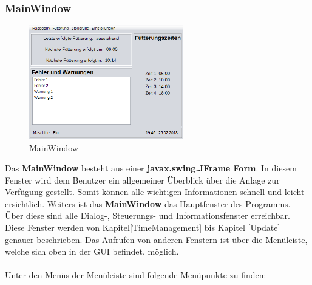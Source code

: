 \subsubsection{MainWindow}\label{subsubsec:MainWindow}
\begin{figure}
\vspace{-20pt}
  \begin{center}
    \includegraphics[width=0.60\textwidth]{Bilder/GUI/MainWindow}
  \end{center}
  \caption{MainWindow}
  \label{MainWindow}
  \vspace{20pt}
\end{figure}
Das \textbf{MainWindow} besteht aus einer \textbf{javax.swing.JFrame Form}. In diesem Fenster wird dem Benutzer ein allgemeiner Überblick über die Anlage zur Verfügung gestellt. Somit können alle wichtigen Informationen schnell und leicht ersichtlich. Weiters ist das \textbf{MainWindow} das Hauptfenster des Programms. Über diese sind alle Dialog-, Steuerungs- und Informationsfenster erreichbar. Diese Fenster werden von Kapitel\ref{TimeManagement} bis Kapitel \ref{Update} genauer beschrieben. Das Aufrufen von anderen Fenstern ist über die Menüleiste, welche sich oben in der \ac{GUI} befindet, möglich. 
\\ \\ Unter den Menüs der Menüleiste sind folgende Menüpunkte zu finden:
